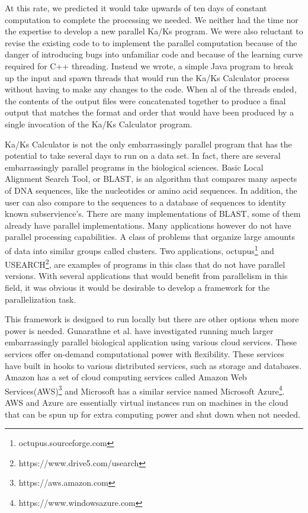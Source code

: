 \documentclass[12pt]{article}
\begin{document}
At this rate, we predicted it would take upwards of ten days of constant
computation to complete the processing we needed. We neither had the time nor
the expertise to develop a new parallel Ka/Ks program. We were also reluctant to
revise the existing code to to implement the parallel computation because of the
danger of introducing bugs into unfamiliar code and because of the learning
curve required for C++ threading. Instead we wrote, a simple Java program to
break up the input and spawn threads that would run the Ka/Ks Calculator process
without having to make any changes to the code. When al of the threads ended,
the contents of the output files were concatenated together to produce a final
output that matches the format and order that would have been produced by a
single invocation of the Ka/Ks Calculator program.

Ka/Ks Calculator is not the only embarrassingly parallel program that has the
potential to take several days to run on a data set. In fact, there are several
embarrassingly parallel programs in the biological sciences. Basic Local
Alignment Search Tool, or BLAST, is an
algorithm that compares many aspects of DNA sequences, like the nucleotides or
amino acid sequences. In addition, the user can also compare to the sequences to
a database of sequences to identity known subservience's. There are many
implementations of BLAST, some of them already have parallel implementations.
Many applications however do not have parallel processing capabilities. A class
of problems that organize large amounts of data into similar groups called
clusters. Two applications, octupus\footnote{octupus.sourceforge.com} and
USEARCH\footnote{https://www.drive5.com/usearch}, are examples of programs in
this class that do not have parallel versions. With several applications that
would benefit from parallelism in this field, it was obvious it would be
desirable to develop a framework for the parallelization task.

This framework is designed to run locally but there are other options when more
power is needed. Gunarathne et al.\cite{cloud} have investigated running much
larger embarrassingly parallel biological application using various cloud
services. These services offer on-demand computational power with flexibility.
These services have built in hooks to various distributed services, such as
storage and databases. Amazon has a set of cloud computing services called
Amazon Web Services(AWS)\footnote{https://aws.amazon.com} and Microsoft has a
similar service named Microsoft Azure\footnote{https://www.windowsazure.com}.
AWS and Azure are essentially virtual instances run on machines in the cloud that
can be spun up for extra computing power and shut down when not needed. 
\end{document}
